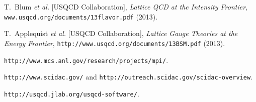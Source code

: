 \begin{thebibliography}{99}

  
T.~Blum {\em et al.} [USQCD Collaboration],
{\em Lattice QCD at the Intensity Frontier},
{\tt www.usqcd.org/documents/13flavor.pdf} (2013).

T.~Applequist {\em et al.} [USQCD Collaboration],
{\em Lattice Gauge Theories at the Energy Frontier},
{\tt http://www.usqcd.org/documents/13BSM.pdf} (2013).

{\tt http://www.mcs.anl.gov/research/projects/mpi/}.

{\tt http://www.scidac.gov/} and {\tt http://outreach.scidac.gov/scidac-overview}.
  
{\tt http://usqcd.jlab.org/usqcd-software/}.

\end{thebibliography}


